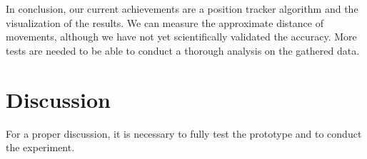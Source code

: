 \documentclass[12pt,twoside, hidelinks]{article}
\begin{document}
In conclusion, our current achievements are a position tracker algorithm and the visualization of the results. We can measure the approximate distance of movements, although we have not yet scientifically validated the accuracy. More tests are needed to be able to conduct a thorough analysis on the gathered data.

\section{Discussion}
\label{sec:discussion}
For a proper discussion, it is necessary to fully test the prototype and to conduct the experiment.




\end{document}
